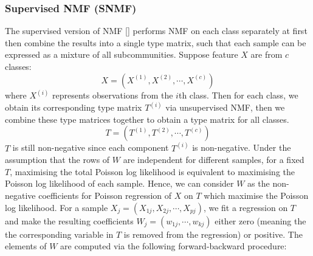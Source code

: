 \documentclass[a4paper,12pt]{article}
\begin{document}
\subsubsection{Supervised NMF (SNMF)}
The supervised version of NMF [\cite{cai2017learning}] performs NMF on each class separately at first then combine the results into a single type matrix, such that each sample can be expressed as a mixture of all subcommunities. Suppose feature $X$ are from $c$ classes:
\begin{equation*}
X=\left(X^{(1)}, X^{(2)}, \cdots, X^{(c)}\right)
\end{equation*}
where $X^{(i)}$ represents observations from the $i$th class. Then for each class, we obtain its corresponding type matrix $T^{(i)}$ via unsupervised NMF, then we combine these type matrices together to obtain a type matrix for all classes.
\begin{equation*}
T=\left(T^{(1)}, T^{(2)}, \cdots, T^{(c)}\right)
\end{equation*}
$T$ is still non-negative since each component $T^{(i)}$ is non-negative. Under the assumption that the rows of $W$ are independent for different samples, for a fixed $T$, maximising the total Poisson log likelihood is equivalent to maximising the Poisson log likelihood of each sample. Hence, we can consider $W$ as the non-negative coefficients for Poisson regression of $X$ on $T$ which maximise the Poisson log likelihood. For a sample $X_{j}=\left(X_{1 j}, X_{2 j}, \cdots, X_{p j}\right)$, we fit a regression on $T$ and make the resulting coefficients $W_{j}=\left(w_{1 j}, \cdots , w_{k j}\right)$ either zero (meaning the the corresponding variable in $T$ is removed from the regression) or positive. The elements of $W$ are computed via the following forward-backward procedure:
\end{document}
